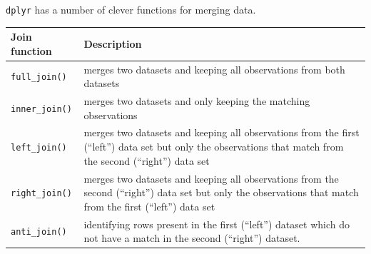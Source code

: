 \documentclass[]{book}
\begin{document}
\texttt{dplyr} has a number of clever functions for merging data.

\begin{longtable}[]{@{}ll@{}}
\toprule
\begin{minipage}[b]{0.10\columnwidth}\raggedright
\textbf{Join function}\strut
\end{minipage} & \begin{minipage}[b]{0.84\columnwidth}\raggedright
\textbf{Description}\strut
\end{minipage}\tabularnewline
\midrule
\endhead
\begin{minipage}[t]{0.10\columnwidth}\raggedright
\texttt{full\_join()}\strut
\end{minipage} & \begin{minipage}[t]{0.84\columnwidth}\raggedright
merges two datasets and keeping all observations from both datasets\strut
\end{minipage}\tabularnewline
\begin{minipage}[t]{0.10\columnwidth}\raggedright
\texttt{inner\_join()}\strut
\end{minipage} & \begin{minipage}[t]{0.84\columnwidth}\raggedright
merges two datasets and only keeping the matching observations\strut
\end{minipage}\tabularnewline
\begin{minipage}[t]{0.10\columnwidth}\raggedright
\texttt{left\_join()}\strut
\end{minipage} & \begin{minipage}[t]{0.84\columnwidth}\raggedright
merges two datasets and keeping all observations from the first (``left'') data set but only the observations that match from the second (``right'') data set\strut
\end{minipage}\tabularnewline
\begin{minipage}[t]{0.10\columnwidth}\raggedright
\texttt{right\_join()}\strut
\end{minipage} & \begin{minipage}[t]{0.84\columnwidth}\raggedright
merges two datasets and keeping all observations from the second (``right'') data set but only the observations that match from the first (``left'') data set\strut
\end{minipage}\tabularnewline
\begin{minipage}[t]{0.10\columnwidth}\raggedright
\texttt{anti\_join()}\strut
\end{minipage} & \begin{minipage}[t]{0.84\columnwidth}\raggedright
identifying rows present in the first (``left'') dataset which do not have a match in the second (``right'') dataset.\strut
\end{minipage}\tabularnewline
\bottomrule
\end{longtable}
\end{document}

